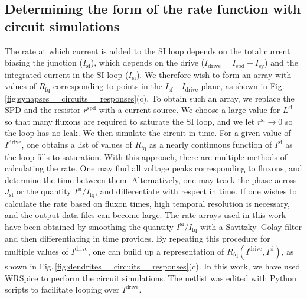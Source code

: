 \documentclass[twocolumn]{article}
\begin{document}
\subsection{Determining the form of the rate function with circuit simulations}
The rate at which current is added to the SI loop depends on the total current biasing the junction ($I_{\mathrm{sf}}$), which depends on the drive ($I_{\mathrm{drive}} = I_{\mathrm{spd}}+I_{\mathrm{sy}}$) and the integrated current in the SI loop ($I_{\mathrm{si}}$). We therefore wish to form an array with values of $R_{\mathrm{fq}}$ corresponding to points in the $I_{\mathrm{sf}}$ - $I_{\mathrm{drive}}$ plane, as shown in Fig.\,\ref{fig:synapses__circuits__responses}(c). To obtain such an array, we replace the SPD and the resistor $r^{\mathrm{spd}}$ with a current source. We choose a large value for $L^{\mathrm{si}}$ so that many fluxons are required to saturate the SI loop, and we let $r^{\mathrm{si}} \rightarrow 0$ so the loop has no leak. We then simulate the circuit in time. For a given value of $I^{\mathrm{drive}}$, one obtains a list of values of $R_{\mathrm{fq}}$ as a nearly continuous function of $I^{\mathrm{si}}$ as the loop fills to saturation. With this approach, there are multiple methods of calculating the rate. One may find all voltage peaks corresponding to fluxons, and determine the time between them. Alternatively, one may track the phase across $J_{\mathrm{sf}}$ or the quantity $I^{\mathrm{si}}/I_{\mathrm{fq}}$, and differentiate with respect in time. If one wishes to calculate the rate based on fluxon times, high temporal resolution is necessary, and the output data files can become large. The rate arrays used in this work have been obtained by smoothing the quantity $I^{\mathrm{si}}/I_{\mathrm{fq}}$ with a Savitzky–Golay filter and then differentiating in time provides. By repeating this procedure for multiple values of $I^{\mathrm{drive}}$, one can build up a representation of $R_{\mathrm{fq}}(I^{\mathrm{drive}},I^{\mathrm{si}})$, as shown in Fig.\,\ref{fig:dendrites__circuits__responses}(c). In this work, we have used WRSpice \cite{wh1991} to perform the circuit simulations. The netlist was edited with Python scripts to facilitate looping over $I^{\mathrm{drive}}$.
\end{document}

